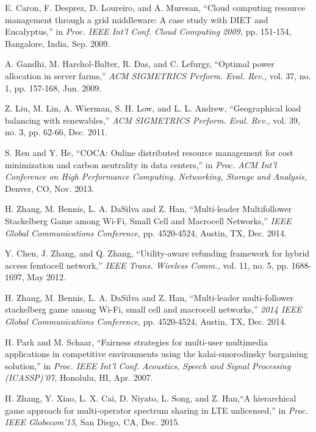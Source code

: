 \documentclass[twocolumn,10pt]{IEEEtran}
\begin{document}
\begin{thebibliography}{1}
E. Caron, F. Desprez, D. Loureiro, and A. Muresan, ``Cloud computing resource management through a grid middleware: A case study with DIET and Eucalyptus,'' in {\em \it Proc. IEEE Int'l Conf.  Cloud Computing 2009,} pp. 151-154, Bangalore, India, Sep. 2009.

A. Gandhi, M. Harchol-Balter, R. Das, and C. Lefurgy, ``Optimal power allocation in server farms,'' {\em \it ACM SIGMETRICS Perform. Eval. Rev.,} vol. 37, no. 1, pp. 157-168, Jun. 2009.



Z. Liu, M. Lin, A. Wierman, S. H. Low, and L. L. Andrew, ``Geographical load balancing with renewables,'' {\em \it ACM SIGMETRICS Perform. Eval. Rev.,} vol. 39, no. 3, pp. 62-66, Dec. 2011.

S. Ren and Y. He, ``COCA: Online distributed resource management for cost minimization and carbon neutrality in data centers,'' in {\em \it Proc. ACM Int'l Conference on High Performance Computing, Networking, Storage and Analysis,} Denver, CO, Nov. 2013.

H. Zhang, M. Bennis, L. A. DaSilva and Z. Han, ``Multi-leader Multifollower Stackelberg Game among Wi-Fi, Small Cell and Macrocell Networks,'' {\em \it IEEE Global Communications Conference,} pp. 4520-4524, Austin, TX, Dec. 2014.

Y. Chen, J. Zhang, and Q. Zhang, ``Utility-aware refunding framework for hybrid access femtocell network,'' {\em \it IEEE Trans. Wireless Comm.,} vol. 11, no. 5, pp. 1688-1697, May 2012.

H. Zhang, M. Bennis, L. A. DaSilva and Z. Han, ``Multi-leader multi-follower stackelberg game among Wi-Fi, small cell and macrocell networks,'' {\em \it 2014 IEEE Global Communications Conference,} pp. 4520-4524, Austin, TX, Dec. 2014.


H. Park and M. Schaar, ``Fairness strategies for multi-user multimedia applications in competitive environments using the kalai-smorodinsky bargaining solution,'' in {\em \it Proc. IEEE Int'l Conf. Acoustics, Speech and Signal Processing (ICASSP)'07,} Honolulu, HI, Apr. 2007.

H. Zhang, Y. Xiao, L. X. Cai, D. Niyato, L. Song, and Z. Han,``A hierarchical game approach for multi-operator spectrum sharing in LTE unlicensed,'' in  {\em \it Proc. IEEE Globecom'15,} San Diego, CA, Dec. 2015.




\end{thebibliography}
\end{document}
